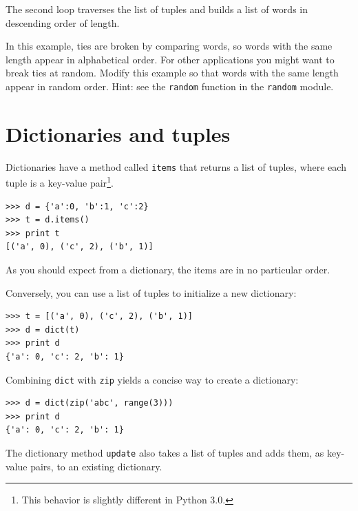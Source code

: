 \documentclass[10pt]{book}
\begin{document}

The second loop traverses the list of tuples and builds a list of
words in descending order of length.

\begin{ex}
In this example, ties are broken by comparing words, so words
with the same length appear in alphabetical order.  For other
applications you might want to break ties at random.  Modify
this example so that words with the same length appear in
random order.  Hint: see the {\tt random} function in the
{\tt random} module.


\end{ex}


\section{Dictionaries and tuples}


Dictionaries have a method called {\tt items} that returns a list of
tuples, where each tuple is a key-value pair\footnote{This behavior is
  slightly different in Python 3.0.}.

\beforeverb
\begin{verbatim}
>>> d = {'a':0, 'b':1, 'c':2}
>>> t = d.items()
>>> print t
[('a', 0), ('c', 2), ('b', 1)]
\end{verbatim}
\afterverb
%
As you should expect from a dictionary, the items are in no
particular order.


Conversely, you can use a list of tuples to initialize
a new dictionary:

\beforeverb
\begin{verbatim}
>>> t = [('a', 0), ('c', 2), ('b', 1)]
>>> d = dict(t)
>>> print d
{'a': 0, 'c': 2, 'b': 1}
\end{verbatim}
\afterverb

Combining {\tt dict} with {\tt zip} yields a concise way
to create a dictionary:


\beforeverb
\begin{verbatim}
>>> d = dict(zip('abc', range(3)))
>>> print d
{'a': 0, 'c': 2, 'b': 1}
\end{verbatim}
\afterverb
%
The dictionary method {\tt update} also takes a list of tuples
and adds them, as key-value pairs, to an existing dictionary.
\end{document}

